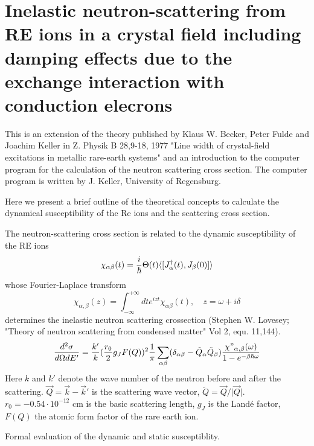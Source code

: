 


%

\section{Inelastic neutron-scattering from RE ions in a crystal field
including damping effects due to the exchange interaction with conduction
elecrons}

\bigskip
This is an extension  of the theory published by Klaus W. Becker, Peter Fulde and
Joachim Keller in Z. Physik B
28,9-18, 1977 
"Line width of crystal-field excitations in metallic rare-earth systems"
and an  introduction to the computer program for the calculation of  the neutron 
scattering cross section. The computer program is written by J. Keller,
University of Regensburg.

\medskip

\noindent
Here we present a brief outline of the theoretical concepts to calculate the
dynamical susceptibility of the Re ions and the scattering cross section.  

The neutron-scattering cross section is related to the dynamic susceptibility
of the  RE ions 
$$
\chi_{\alpha\beta}(t)={i\over \hbar} \Theta(t)\langle [J^\dagger_\alpha(t), J_\beta(0)]\rangle 
$$
whose Fourier-Laplace transform
$$
\chi_{\alpha,\beta}(z)=\int_{-\infty}^{+\infty} dt e^{izt}\chi_{\alpha\beta}(t), \quad z=\omega
+i\delta 
$$
determines the inelastic neutron scattering crossection   
(Stephen W. Lovesey; "Theory of neutron 
scattering from condensed matter"
Vol 2, equ. 11,144).
$$
{d^2\sigma \over d\Omega d E'}=  {k' \over
k}({r_0\over 2}g_J F(Q))^2{1\over \pi }
\sum_{\alpha\beta}(\delta_{\alpha\beta} 
- \tilde Q_\alpha \tilde Q_\beta)
{ \chi{"}_{\alpha,\beta}(\omega)\over 1-e^{-\beta \hbar \omega}} 
$$
Here $k$ and
$ k'$ denote the  wave number of the neutron before and after the
scattering. $\vec Q = \vec k - \vec k'$ is the scattering wave vector,
$\tilde Q = \vec Q/\vert\vec Q\vert$. 
$r_0= -0.54 \cdot 10^{-12}$ cm is the basic scattering length, $g_J$ is the Land\'e factor, 
$F(Q)$ the atomic form factor of the
rare earth ion.
  
\bigskip
\noindent
Formal evaluation of the dynamic and static susceptiblity.


